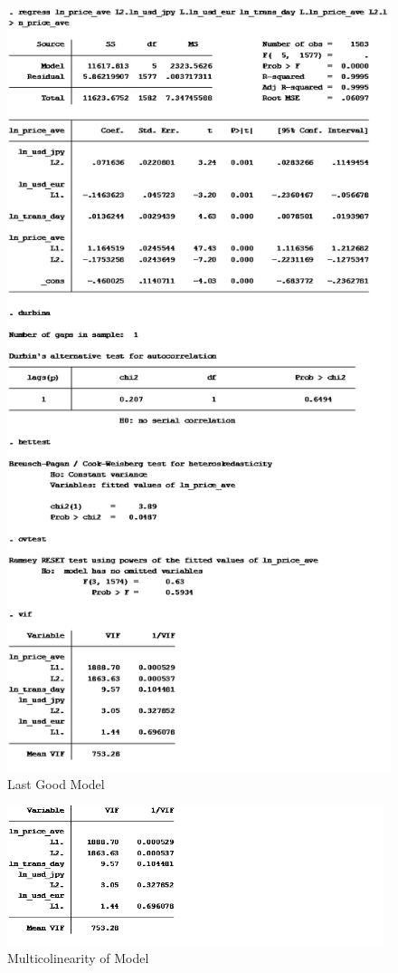 \documentclass{article}[10 pt]
\begin{document}
\begin{figure}[ht!]

\centering

\includegraphics[width=125mm]{reg5.png}

\caption{Last Good Model}

\label{overflow}

\end{figure}

\clearpage

\newpage

\begin{figure}[ht!]

\centering

\includegraphics[width=110mm]{reg5_vif.png}

\caption{Multicolinearity of Model}

\label{overflow}

\end{figure}
\end{document}
